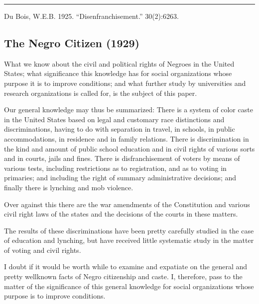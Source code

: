 \documentclass[letterpaper,10pt,english]{jupyterBook}
\begin{document}
\bigskip\hrule\bigskip


\sphinxAtStartPar
{} Du Bois, W.E.B. 1925. “Disenfranchisement.”   30(2):62\sphinxhyphen{}63.


\subsection{The Negro Citizen (1929)}
\label{\detokenize{Volumes/36/05/negro_citizen:the-negro-citizen-1929}}\label{\detokenize{Volumes/36/05/negro_citizen::doc}}
\sphinxAtStartPar
{}

\sphinxAtStartPar
What we know about the civil and political rights of Negroes in the United States; what significance this knowledge has for social organizations whose purpose it is to improve conditions; and what further study by universities and research organizations is called for, is the subject of this paper.

\sphinxAtStartPar
Our general knowledge may thus be summarized: There is a system of color caste in the United States based on legal and customary race distinctions and discriminations, having to do with separation in travel, in schools, in public accommodations, in residence and in family relations. There is discrimination in the kind and amount of public school education and in civil rights of various sorts and in courts, jails and fines. There is disfranchisement of voters by means of various tests, including restrictions as to registration, and as to voting in primaries; and including the right of summary administrative decisions; and finally there is lynching and mob violence.

\sphinxAtStartPar
Over against this there are the war amendments of the Constitution and various civil right laws of the states and the decisions of the courts in these matters.

\sphinxAtStartPar
The results of these discriminations have been pretty carefully studied in the case of education and lynching, but have received little systematic study in the matter of voting and civil rights.

\sphinxAtStartPar
I doubt if it would be worth while to examine and expatiate on the general and pretty well\sphinxhyphen{}known facts of Negro citizenship and caste. I, therefore, pass to the matter of the significance of this general knowledge for social organizations whose purpose is to improve conditions.
\end{document}
